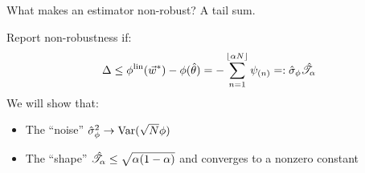 \begin{frame}{What makes an estimator non-robust?  A tail sum.}

Report non-robustness if:
%
\begin{align*}
%
\Delta \le \thetafunlin(\w^*) - \thetafun(\thetahat)  =
    - \sum_{n=1}^{\lfloor \alpha N \rfloor} \infl_{(n)}
    =: \noise \shape
%
\end{align*}
%
We will show that:
%
\begin{itemize}
\item The ``noise'' $\hat\sigma_{\phi}^2 \rightarrow \mathrm{Var}(\sqrt{N}\phi)$
    \citep{hampel1986robustbook}
\item The ``shape'' $\hat{\mathscr{T}}_\alpha \le \sqrt{\alpha (1 - \alpha)}$
    and converges to a nonzero constant
\end{itemize}


\end{frame}
